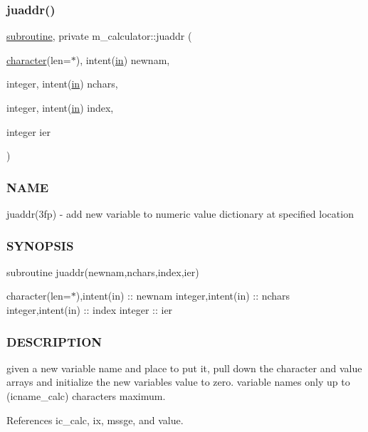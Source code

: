 \subsubsection{\texorpdfstring{juaddr()}{juaddr()}}
{\footnotesize\ttfamily \hyperlink{M__stopwatch_83_8txt_acfbcff50169d691ff02d4a123ed70482}{subroutine}, private m\+\_\+calculator\+::juaddr (\begin{DoxyParamCaption}\item[{\hyperlink{option__stopwatch_83_8txt_abd4b21fbbd175834027b5224bfe97e66}{character}(len=$\ast$), intent(\hyperlink{M__journal_83_8txt_afce72651d1eed785a2132bee863b2f38}{in})}]{newnam,  }\item[{integer, intent(\hyperlink{M__journal_83_8txt_afce72651d1eed785a2132bee863b2f38}{in})}]{nchars,  }\item[{integer, intent(\hyperlink{M__journal_83_8txt_afce72651d1eed785a2132bee863b2f38}{in})}]{index,  }\item[{integer}]{ier }\end{DoxyParamCaption})\hspace{0.3cm}{\ttfamily [private]}}



\subsubsection*{N\+A\+ME}

juaddr(3fp) -\/ add new variable to numeric value dictionary at specified location 

\subsubsection*{S\+Y\+N\+O\+P\+S\+IS}

subroutine juaddr(newnam,nchars,index,ier)

character(len=$\ast$),intent(in) \+:\+: newnam integer,intent(in) \+:\+: nchars integer,intent(in) \+:\+: index integer \+:\+: ier

\subsubsection*{D\+E\+S\+C\+R\+I\+P\+T\+I\+ON}

given a new variable name and place to put it, pull down the character and value arrays and initialize the new variable\textquotesingle{}s value to zero. variable names only up to (icname\+\_\+calc) characters maximum. 

References ic\+\_\+calc, ix, mssge, and value.


